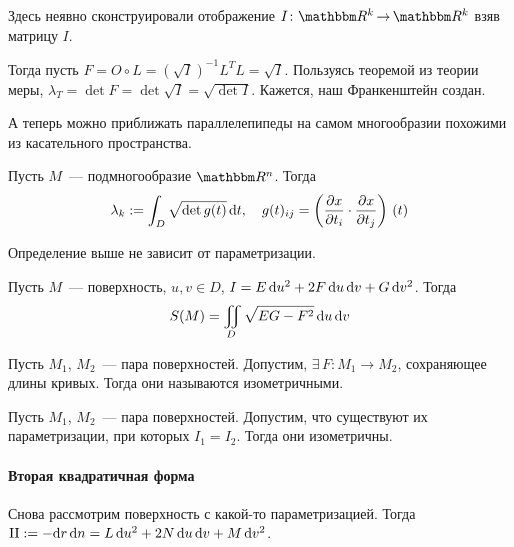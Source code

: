 \documentclass[draft,timbord]{longnotes}
\begin{document}
Здесь неявно сконструировали отображение $I\colon \R^k \to \R^k$ взяв матрицу $I$.

Тогда пусть $F = O \circ L = \left(\sqrt{I}\right)^{-1} L^T L = \sqrt{I}$.
Пользуясь теоремой из теории меры, $\lambda_T = \det F = \det \sqrt I = \sqrt {\det I}$.
Кажется, наш Франкенштейн создан.

А теперь можно приближать параллелепипеды на самом многообразии
похожими из касательного пространства.


\begin{defn}\label{thrm:dg::area::manifold}
  Пусть $M$~--- подмногообразие $\R^n$.  Тогда 
  \[
      \lambda_k := \int _D \sqrt {\det g(t)} \, \mathrm{d} t, \quad
      g(t)_{ij} = \left(\frac{\partial x}{\partial t_i} \cdot \frac{\partial x}{\partial t_j}\right)\, (t)
  \]
\end{defn}

\begin{thrm}\label{thrm:dg::area::manifoldcor}
  Определение выше не зависит от параметризации.
\end{thrm}

\begin{thrm}\label{thrm:dg::area::area}
  Пусть $M$~--- поверхность, $u,v\in D$, $I = E \, \mathrm{d} u^2 + 2F\, \mathrm{d} u \,\mathrm{d} v + G\, \mathrm{d} v^2$.
  Тогда
  \[
    S(M) = \iint_D \sqrt{EG - F^2}\, \mathrm{d} u\,\mathrm{d} v
  \]
\end{thrm}

\begin{defn}\label{defn:dg::area::isom}
  Пусть $M_1$, $M_2$~--- пара поверхностей. Допустим, $\exists\, F \colon M_1 \to M_2$, 
  сохраняющее длины кривых. Тогда они называются  изометричными.
\end{defn}

\begin{thrm}\label{thrm:dg::area::Iisom}
  Пусть $M_1$, $M_2$~--- пара поверхностей. Допустим, что существуют их параметризации, 
  при которых $I_1= I_2$. Тогда они изометричны.
\end{thrm}

\paragraph{Вторая квадратичная форма}
\label{par:dg::II}

\begin{defn}\label{defn:dg::II}
  Снова рассмотрим поверхность с  какой-то параметризацией. Тогда 
  ${\rm II} := - \mathrm{d} r \, \mathrm{d} n = L \, \mathrm{d} u^2 + 2N\, \mathrm{d} u \,\mathrm{d} v + M\, \mathrm{d} v^2$.
\end{defn}
\end{document}
